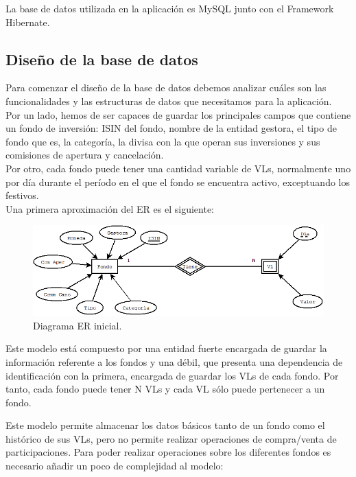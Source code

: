 \documentclass[12pt, a4paper]{book}
\begin{document}
La base de datos utilizada en la aplicación es MySQL junto con el Framework Hibernate.

\subsection{Diseño de la base de datos}
Para comenzar el diseño de la base de datos debemos analizar cuáles son las funcionalidades y las estructuras de datos que necesitamos para la aplicación.\\

Por un lado, hemos de ser capaces de guardar los principales campos que contiene un fondo de inversión: \gls{ISIN} del fondo, nombre de la entidad gestora, el tipo de fondo que es, la categoría, la divisa con la que operan sus inversiones y sus comisiones de apertura y cancelación.\\

Por otro, cada fondo puede tener una cantidad variable de \gls{VL}s, normalmente uno por día durante el período en el que el fondo se encuentra activo, exceptuando los festivos.\\

Una primera aproximación del \gls{ER} es el siguiente:\\



\begin{figure}[htbp]
	\centering
	\includegraphics[width=\textwidth]{figuras/ERSimple.png}
	\caption{Diagrama ER inicial.}
	\label{fig:erinicial}
\end {figure}

Este modelo está compuesto por una entidad fuerte encargada de guardar la información referente a los fondos y una débil, que presenta una dependencia de identificación con la primera, encargada de guardar los \gls{VL}s de cada fondo. Por tanto, cada fondo puede tener N \gls{VL}s y cada \gls{VL} sólo puede pertenecer a un fondo.

\newpage

Este modelo permite almacenar los datos básicos tanto de un fondo como el histórico de sus \gls{VL}s, pero no permite realizar operaciones de compra/venta de participaciones. Para poder realizar operaciones sobre los diferentes fondos es necesario añadir un poco de complejidad al modelo:
\end{document}
